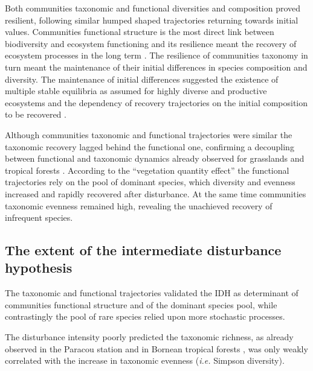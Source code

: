 \documentclass[fleqn,10pt]{ArtEcoFoG} %
\theoremstyle{definition}
\theoremstyle{definition}
\theoremstyle{definition}
\theoremstyle{remark}
\begin{document}
Both communities taxonomic and functional diversities and composition
proved resilient, following similar humped shaped trajectories returning
towards initial values. Communities functional structure is the most
direct link between biodiversity and ecosystem functioning
\citep{Diaz2005} and its resilience meant the recovery of ecosystem
processes in the long term \citep{Guariguata2001}. The resilience of
communities taxonomy in turn meant the maintenance of their initial
differences in species composition and diversity. The maintenance of
initial differences suggested the existence of multiple stable
equilibria as assumed for highly diverse and productive ecosystems
\citep{Chase2003} and the dependency of recovery trajectories on the
initial composition to be recovered
\citep{Hubbell1999, Molino2001, Anderson2007, Baraloto2012a}.

Although communities taxonomic and functional trajectories were similar
the taxonomic recovery lagged behind the functional one, confirming a
decoupling between functional and taxonomic dynamics already observed
for grasslands \citep{Tilman1997, Mouillot2011} and tropical forests
\citep{Lohbeck2015, Guariguata2001}. According to the ``vegetation
quantity effect'' \citep{Grime1998} the functional trajectories rely on
the pool of dominant species, which diversity and evenness increased and
rapidly recovered after disturbance. At the same time communities
taxonomic evenness remained high, revealing the unachieved recovery of
infrequent species.

\subsection{The extent of the intermediate disturbance
hypothesis}\label{the-extent-of-the-intermediate-disturbance-hypothesis}

The taxonomic and functional trajectories validated the IDH as
determinant of communities functional structure and of the dominant
species pool, while contrastingly the pool of rare species relied upon
more stochastic processes.

The disturbance intensity poorly predicted the taxonomic richness, as
already observed in the Paracou station \citep{Baraloto2012a} and in
Bornean tropical forests \citep{Cannon1998}, was only weakly correlated
with the increase in taxonomic evenness (\emph{i.e.} Simpson diversity).
\end{document}
